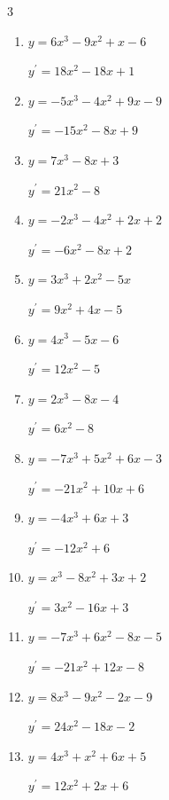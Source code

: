\begin{multicols}{3}
\begin{enumerate}
  \item $y=6x^{3}-9x^{2}+x-6$

        $\displaystyle y^{\prime}=18x^{2}-18x+1$

  \item $y=-5x^{3}-4x^{2}+9x-9$

        $\displaystyle y^{\prime}=-15x^{2}-8x+9$

  \item $y=7x^{3}-8x+3$

        $\displaystyle y^{\prime}=21x^{2}-8$

  \item $y=-2x^{3}-4x^{2}+2x+2$

        $\displaystyle y^{\prime}=-6x^{2}-8x+2$

  \item $y=3x^{3}+2x^{2}-5x$

        $\displaystyle y^{\prime}=9x^{2}+4x-5$

  \item $y=4x^{3}-5x-6$

        $\displaystyle y^{\prime}=12x^{2}-5$

  \item $y=2x^{3}-8x-4$

        $\displaystyle y^{\prime}=6x^{2}-8$

  \item $y=-7x^{3}+5x^{2}+6x-3$

        $\displaystyle y^{\prime}=-21x^{2}+10x+6$

\columnbreak %

  \item $y=-4x^{3}+6x+3$

        $\displaystyle y^{\prime}=-12x^{2}+6$

  \item $y=x^{3}-8x^{2}+3x+2$

        $\displaystyle y^{\prime}=3x^{2}-16x+3$

  \item $y=-7x^{3}+6x^{2}-8x-5$

        $\displaystyle y^{\prime}=-21x^{2}+12x-8$

  \item $y=8x^{3}-9x^{2}-2x-9$

        $\displaystyle y^{\prime}=24x^{2}-18x-2$

  \item $y=4x^{3}+x^{2}+6x+5$

        $\displaystyle y^{\prime}=12x^{2}+2x+6$


\end{enumerate}
\end{multicols}
